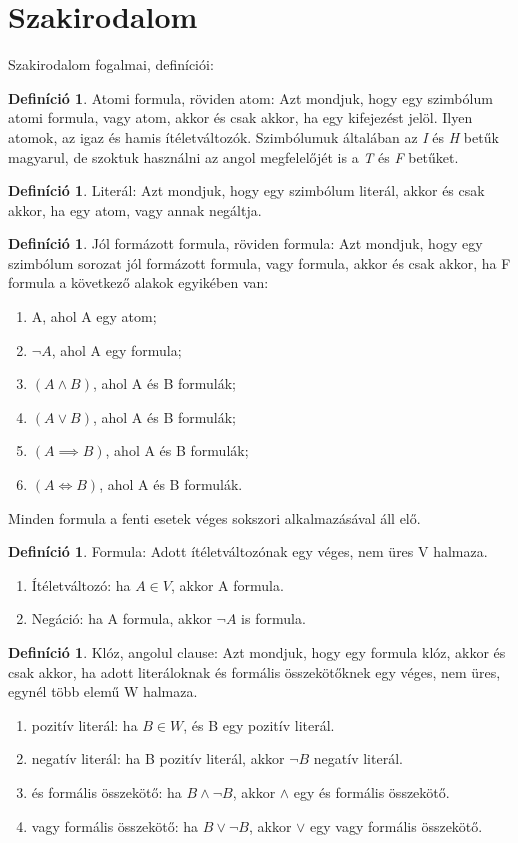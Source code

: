 \documentclass[
]{thesis-ekf}
\theoremstyle{definition}
\newtheorem{definicio}[tetel]{Definíció}
\theoremstyle{remark}
\begin{document}
	\section{Szakirodalom}
	Szakirodalom fogalmai, definíciói:
	
	\begin{definicio}
		Atomi formula, röviden atom:  Azt mondjuk, hogy egy szimbólum atomi formula, vagy atom, akkor és csak akkor, ha egy kifejezést jelöl. Ilyen atomok, az igaz és hamis ítéletváltozók. Szimbólumuk általában az \emph{I} és \emph{H} betűk magyarul, de szoktuk használni az angol megfelelőjét is a \emph{T} és \emph{F} betűket.
	\end{definicio}
	\begin{definicio}
		Literál: Azt mondjuk, hogy egy szimbólum literál, akkor és csak akkor, ha egy atom, vagy annak negáltja.
	\end{definicio}
	\begin{definicio}		
		Jól formázott formula, röviden formula: Azt mondjuk, hogy egy szimbólum sorozat jól formázott formula, vagy formula, akkor és csak akkor, ha F formula a következő alakok egyikében van:
		\begin{enumerate}[label=\textit{(\alph*)}]
			\item A, ahol A egy atom;
			\item $ \neg A $, ahol A egy formula;
			\item $ (A \wedge B) $, ahol A és B formulák;
			\item $ (A \vee B) $, ahol A és B formulák;
			\item $ (A \implies B) $, ahol A és B formulák;
			\item $ (A \Leftrightarrow B) $, ahol A és B formulák.
		\end{enumerate}
		Minden formula a fenti esetek véges sokszori alkalmazásával áll elő.
	\end{definicio}
	\begin{definicio}
		Formula: Adott ítéletváltozónak egy véges, nem üres V halmaza.
		\begin{enumerate}
			\item Ítéletváltozó: ha $ A\in V $, akkor A formula.
			\item Negáció: ha A formula, akkor $\neg A $ is formula.
		\end{enumerate}
	\end{definicio}
	\begin{definicio}
		Klóz, angolul clause: Azt mondjuk, hogy egy formula klóz, akkor és csak akkor, ha adott literáloknak és formális összekötőknek egy véges, nem üres, egynél több elemű W halmaza.
		\begin{enumerate}
			\item pozitív literál: ha $ B\in W $, és B egy pozitív literál.
			\item negatív literál: ha B pozitív literál, akkor $\neg B $ negatív literál.
			\item és formális összekötő: ha $ B \wedge \neg B $, akkor $\wedge$ egy és formális összekötő.
			\item vagy formális összekötő: ha $ B \vee \neg B $, akkor $\vee$ egy vagy formális összekötő.
		\end{enumerate}	
	\end{definicio}
\end{document}
